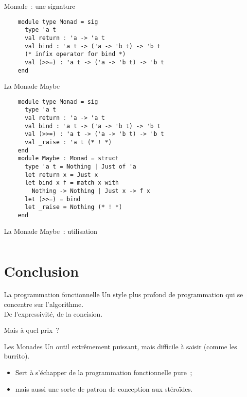 \documentclass[10pt]{beamer}
\begin{document}
\begin{frame}[fragile]{Monade~: une signature}
  \begin{verbatim}
    module type Monad = sig
      type 'a t
      val return : 'a -> 'a t
      val bind : 'a t -> ('a -> 'b t) -> 'b t
      (* infix operator for bind *)
      val (>>=) : 'a t -> ('a -> 'b t) -> 'b t
    end
  \end{verbatim}
\end{frame}

\begin{frame}[fragile]{La Monade Maybe}
  \begin{verbatim}
    module type Monad = sig
      type 'a t
      val return : 'a -> 'a t
      val bind : 'a t -> ('a -> 'b t) -> 'b t
      val (>>=) : 'a t -> ('a -> 'b t) -> 'b t
      val _raise : 'a t (* ! *)
    end
    module Maybe : Monad = struct
      type 'a t = Nothing | Just of 'a
      let return x = Just x
      let bind x f = match x with
        Nothing -> Nothing | Just x -> f x
      let (>>=) = bind
      let _raise = Nothing (* ! *)
    end
  \end{verbatim}
\end{frame}

\begin{frame}[fragile]{La Monade Maybe~: utilisation}
  \begin{multicols}{2}
    \inputminted{ocaml}{maybe.ml}
  \end{multicols}
\end{frame}

\section{Conclusion}

\begin{frame}{La programmation fonctionnelle}
  Un style plus profond de programmation qui se concentre sur
  l'algorithme.\\
  De l'expressivité, de la concision.

  Mais à quel prix~?
\end{frame}

\begin{frame}{Les Monades}
  Un outil extrêmement puissant, mais difficile à saisir (comme les
  burrito).

  \begin{itemize}
  \item Sert à s'échapper de la programmation fonctionnelle pure~;
  \item mais aussi une sorte de patron de conception aux stéroïdes.
  \end{itemize}
\end{frame}
\end{document}
